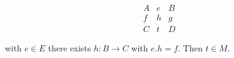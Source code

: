 $$\begin{array}{cccc}
A & e & B \\
f & h & g \\
C & t & D
\end{array}$$

with $e \in E$ there exists $h: B \longrightarrow C$ with $e.h = f$. Then $t \in M$.